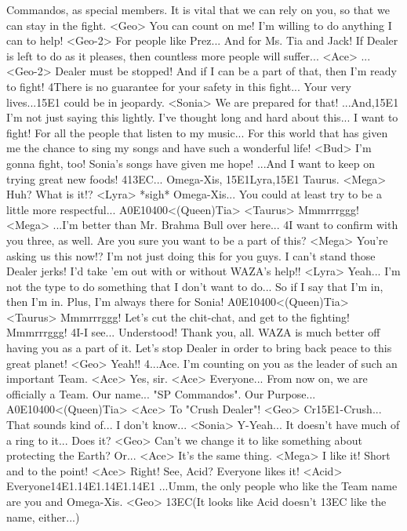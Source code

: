 Commandos, as special members. 
It is vital that we can rely on you, so that we can stay in the fight. 
<Geo> You can count on me! 
I'm willing to do anything I can to help! 
<Geo-2> For people like Prez... 
And for Ms. Tia and Jack! 
If Dealer is left to do as it pleases, then countless more people will suffer... 
<Ace> ... 
<Geo-2> Dealer must be stopped! 
And if I can be a part of that, then I'm ready to fight! 
4There is no guarantee for your safety in this fight... 
Your very lives...{15}{E1} could be in jeopardy. 
<Sonia> We are prepared for that! 
...And,{15}{E1} I'm not just saying this lightly. I've thought long and hard about this... 
I want to fight! 
For all the people that listen to my music... 
For this world that has given me the chance to sing 
my songs and have such a wonderful life! 
<Bud> I'm gonna fight, too! 
Sonia's songs have given me hope! 
...And I want to keep on trying great new foods! 
4{13}{EC}... 
Omega-Xis, {15}{E1}Lyra,{15}{E1} Taurus. 
<Mega> Huh? What is it!? 
<Lyra> *sigh* 
Omega-Xis... You could at least try to be a little more respectful... 
{A0}{E1}{04}{00}<(Queen)Tia> 
<Taurus> Mmmrrrggg! 
<Mega> ...I'm better than Mr. Brahma Bull over here... 
4I want to confirm with you three, as well. 
Are you sure you want to be a part of this? 
<Mega> You're asking us this now!? 
I'm not just doing this for you guys. I can't stand those Dealer jerks! 
I'd take 'em out with or without WAZA's help!! 
<Lyra> Yeah... 
I'm not the type to do something that I don't want to do... 
So if I say that I'm in, then I'm in. 
Plus, I'm always there for Sonia! 
{A0}{E1}{04}{00}<(Queen)Tia> 
<Taurus> Mmmrrrggg! 
Let's cut the chit-chat, and get to the fighting! 
Mmmrrrggg! 
4I-I see... 
Understood! 
Thank you, all. 
WAZA is much better off having you as a part of it. 
Let's stop Dealer in order to bring back peace to this great planet! 
<Geo> Yeah!! 
4...Ace. 
I'm counting on you as the leader of such an important Team. 
<Ace> Yes, sir. 
<Ace> Everyone... 
From now on, we are officially a Team. 
Our name... "SP Commandos". 
Our Purpose... 
{A0}{E1}{04}{00}<(Queen)Tia> 
<Ace> To "Crush Dealer"! 
<Geo> Cr{15}{E1}-Crush... 
That sounds kind of... I don't know... 
<Sonia> Y-Yeah... It doesn't have much of a ring to it... Does it? 
<Geo> Can't we change it to like something about protecting the Earth? Or... 
<Ace> It's the same thing. 
<Mega> I like it! Short and to the point! 
<Ace> Right! 
See, Acid? Everyone likes it! 
<Acid> Everyone{14}{E1}.{14}{E1}.{14}{E1}.{14}{E1} 
...Umm, the only people who like the Team name are you and Omega-Xis. 
<Geo> {13}{EC}(It looks like Acid doesn't {13}{EC} like the name, either...) 

